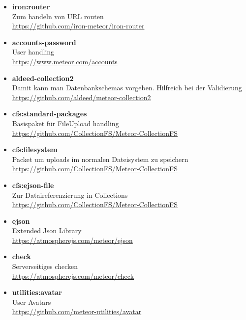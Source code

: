 \documentclass[Info_VK_Website_Dokumentation.tex]{subfiles}
\begin{document}
\begin{itemize}
 	\item \textbf{iron:router}\\
 	Zum handeln von URL routen \\
 	\small \url{https://github.com/iron-meteor/iron-router} 

 	\item \textbf{accounts-password}\\
 	User handling \\
 	\small \url{https://www.meteor.com/accounts} 

 	\item \textbf{aldeed-collection2}\\
 	Damit kann man Datenbankschemas vorgeben. Hilfreich bei der Validierung \\
 	\small \url{https://github.com/aldeed/meteor-collection2} 

 	\item \textbf{cfs:standard-packages}\\
 	Basispaket für FileUpload handling\\
 	\small \url{https://github.com/CollectionFS/Meteor-CollectionFS} 

 	\item \textbf{cfs:filesystem}\\
 	Packet um uploads im normalen Dateisystem zu speichern\\
 	\small \url{https://github.com/CollectionFS/Meteor-CollectionFS} 

 	\item \textbf{cfs:ejson-file}\\
 	Zur Dataireferenzierung in Collections\\
 	\small \url{https://github.com/CollectionFS/Meteor-CollectionFS} \\ 

 	\item \textbf{ejson}\\
 	Extended Json Library\\
 	\small \url{https://atmospherejs.com/meteor/ejson}

 	\item \textbf{check}\\
 	Serverseitiges checken\\
 	\small \url{https://atmospherejs.com/meteor/check} 

 	\item \textbf{utilities:avatar}\\
 	User Avatars\\
 	\small \url{https://github.com/meteor-utilities/avatar} 


\end{itemize}
\end{document}
